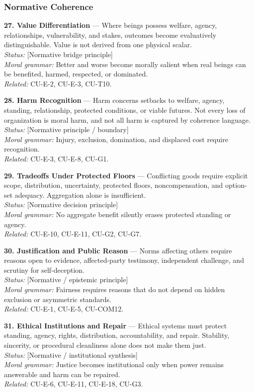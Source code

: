 \documentclass[
  11pt,
]{article}
\begin{document}
\subsubsection{Normative Coherence}\label{normative-coherence}

\textbf{27. Value Differentiation} --- Where beings possess welfare,
agency, relationships, vulnerability, and stakes, outcomes become
evaluatively distinguishable. Value is not derived from one physical
scalar.\\
\emph{Status:} {[}Normative bridge principle{]}\\
\emph{Moral grammar:} Better and worse become morally salient when real
beings can be benefited, harmed, respected, or dominated.\\
\emph{Related:} CU-E-2, CU-E-3, CU-T10.

\textbf{28. Harm Recognition} --- Harm concerns setbacks to welfare,
agency, standing, relationship, protected conditions, or viable futures.
Not every loss of organization is moral harm, and not all harm is
captured by coherence language.\\
\emph{Status:} {[}Normative principle / boundary{]}\\
\emph{Moral grammar:} Injury, exclusion, domination, and displaced cost
require recognition.\\
\emph{Related:} CU-E-3, CU-E-8, CU-G1.

\textbf{29. Tradeoffs Under Protected Floors} --- Conflicting goods
require explicit scope, distribution, uncertainty, protected floors,
noncompensation, and option-set adequacy. Aggregation alone is
insufficient.\\
\emph{Status:} {[}Normative decision principle{]}\\
\emph{Moral grammar:} No aggregate benefit silently erases protected
standing or agency.\\
\emph{Related:} CU-E-10, CU-E-11, CU-G2, CU-G7.

\textbf{30. Justification and Public Reason} --- Norms affecting others
require reasons open to evidence, affected-party testimony, independent
challenge, and scrutiny for self-deception.\\
\emph{Status:} {[}Normative / epistemic principle{]}\\
\emph{Moral grammar:} Fairness requires reasons that do not depend on
hidden exclusion or asymmetric standards.\\
\emph{Related:} CU-E-1, CU-E-5, CU-COM12.

\textbf{31. Ethical Institutions and Repair} --- Ethical systems must
protect standing, agency, rights, distribution, accountability, and
repair. Stability, sincerity, or procedural cleanliness alone does not
make them just.\\
\emph{Status:} {[}Normative / institutional synthesis{]}\\
\emph{Moral grammar:} Justice becomes institutional only when power
remains answerable and harm can be repaired.\\
\emph{Related:} CU-E-6, CU-E-11, CU-E-18, CU-G3.
\end{document}
